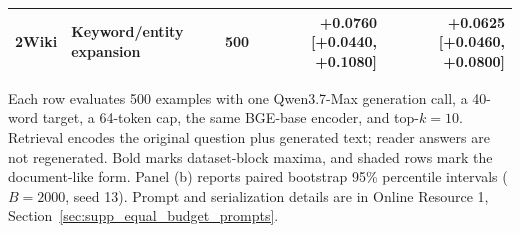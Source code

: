 \begin{table}[t]
\begin{threeparttable}
\begin{tabularx}{\textwidth}{l >{\raggedright\arraybackslash}X r r r}
2Wiki & Keyword/entity expansion & 500 & +0.0760 [+0.0440, +0.1080] & +0.0625 [+0.0460, +0.0800] \\
\bottomrule
\end{tabularx}
\begin{tablenotes}
\footnotesize
\item Each row evaluates 500 examples with one Qwen3.7-Max generation call, a 40-word target, a 64-token cap, the same BGE-base encoder, and top-$k=10$. Retrieval encodes the original question plus generated text; reader answers are not regenerated. Bold marks dataset-block maxima, and shaded rows mark the document-like form. Panel (b) reports paired bootstrap 95\% percentile intervals ($B=2000$, seed 13). Prompt and serialization details are in Online Resource 1, Section~\ref{sec:supp_equal_budget_prompts}.
\end{tablenotes}
\end{threeparttable}
\end{table}
